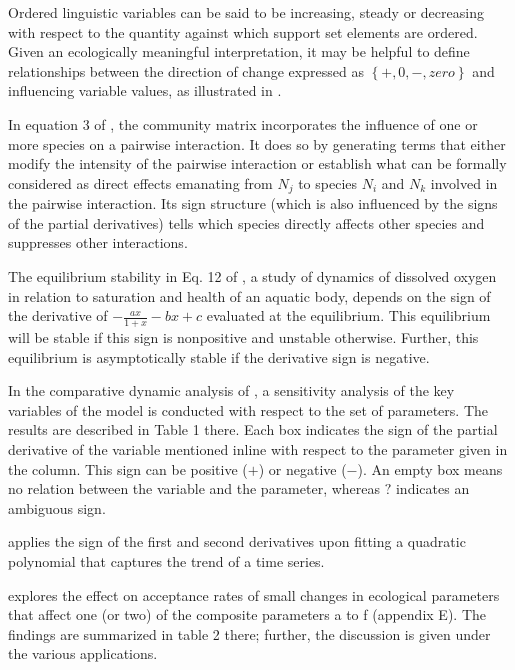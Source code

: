 \documentclass[11pt]{book}
\begin{document}
Ordered linguistic variables can be said to be increasing, steady
or decreasing with respect to the quantity against which support set
elements are ordered. Given an ecologically meaningful interpretation,
it may be helpful to define relationships between the direction of
change expressed as $\left\{ +,0,-,zero\right\} $ and influencing
variable values, as illustrated in \cite{mcintosh2003qualitative}.

In equation 3 of \cite{dambacher2007understanding}, the community
matrix incorporates the influence of one or more species on a pairwise
interaction. It does so by generating terms that either modify the
intensity of the pairwise interaction or establish what can be formally
considered as direct effects emanating from $N_{j}$ to species $N_{i}$
and $N_{k}$ involved in the pairwise interaction. Its sign structure
(which is also influenced by the signs of the partial derivatives)
tells which species directly affects other species and suppresses
other interactions.

The equilibrium stability in Eq. 12 of \cite{prasad2014dynamics}, a study of dynamics of dissolved oxygen in relation to saturation and health of
an aquatic body,
depends on the sign of the derivative of $-\frac{ax}{1+x}-bx+c$ evaluated
at the equilibrium. This equilibrium will be stable if this sign is
nonpositive and unstable otherwise. Further, this equilibrium is asymptotically
stable if the derivative sign is negative.

In the comparative dynamic analysis of \cite{lafforgue2019dynamic},
a sensitivity analysis of the key variables of the model is conducted
with respect to the set of parameters. The results are described in
Table 1 there. Each box indicates the sign of the partial derivative
of the variable mentioned inline with respect to the parameter given
in the column. This sign can be positive (\textquotedbl$+$\textquotedbl )
or negative (\textquotedbl$-$\textquotedbl ). An empty box means
no relation between the variable and the parameter, whereas \textquotedbl$?$\textquotedbl{}
indicates an ambiguous sign.

\cite{rigal2020method} applies the sign of the first and second derivatives
upon fitting a quadratic polynomial that captures the trend of a time
series.

\cite{holen2021coping} explores the effect on acceptance rates of
small changes in ecological parameters that affect one (or two) of
the composite parameters a to f (appendix E). The findings are summarized
in table 2 there; further, the discussion is given under the various
applications.
\end{document}
